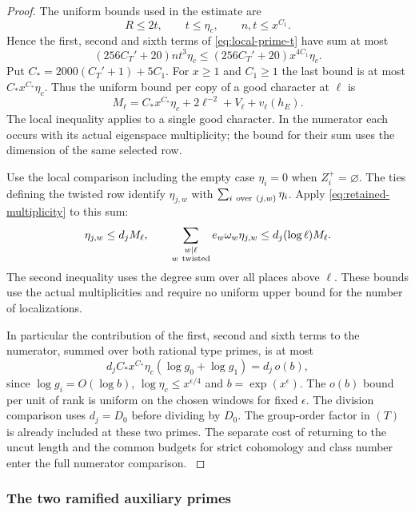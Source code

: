 \begin{proof}
The uniform bounds used in the estimate are
\[
 R\le2t,\qquad t\le\eta_c,\qquad n,t\le x^{C_1}.
\]
Hence
the first, second and sixth terms of \eqref{eq:local-prime-t} have sum at most
\[
 (256C_T'+20)nt^3\eta_c
 \le (256C_T'+20)x^{4C_1}\eta_c .
\]
Put \(C_* = 2000(C_T'+1)+5C_1\). For \(x\ge1\) and
\(C_1\ge1\) the last bound is at most
\(C_*x^{C_*}\eta_c\). Thus the uniform bound per
copy of a good character at \(\ell\) is
\[
 M_\ell=C_*x^{C_*}\eta_c+
            2\ell^{-2}+V_\ell+v_\ell(h_E).
\]
The local inequality applies to a single good character. In the numerator each occurs with its actual eigenspace multiplicity; the bound for their sum uses the dimension of the same selected row.

Use the local comparison including the empty case
\(\eta_i=0\) when \(Z_i^+=\varnothing\).
The ties defining the twisted row identify \(\eta_{j,w}\)
with \(\sum_{i\ {\rm over}\ (j,w)}\eta_i\). Apply
\eqref{eq:retained-multiplicity} to this sum:
\[
 \eta_{j,w}\le d_j M_\ell,\qquad
 \sum_{\substack{w\mid\ell\\w\ {\rm twisted}}}
        e_w\omega_w\eta_{j,w}\le d_j(\log\ell)M_\ell .
\]
The second inequality uses the degree sum over all places
above \(\ell\). These bounds use the actual multiplicities
and require no uniform upper bound for the number of
localizations.

In particular the contribution of the first, second and
sixth terms to the numerator, summed over both rational
type primes, is at most
\[
 d_j C_*x^{C_*}\eta_c(\log g_0+\log g_1)=d_j\,o(b),
\]
since \(\log g_i=O(\log b)\), \(\log\eta_c\le x^{\epsilon/4}\)
and \(b=\exp(x^\epsilon)\). The \(o(b)\) bound per unit of rank
is uniform on the chosen windows for fixed \(\epsilon\). The division
comparison uses \(d_j=D_0\) before dividing by \(D_0\).
The group-order factor in \((T)\) is already included at
these two primes. The separate cost of returning to the
uncut length and the common budgets for strict cohomology
and class number enter the full numerator comparison.
\label{cor:special-prime-lengths-6}
\end{proof}

\subsubsection*{The two ramified auxiliary primes}\label{subsec:ramified-auxiliary-row}

